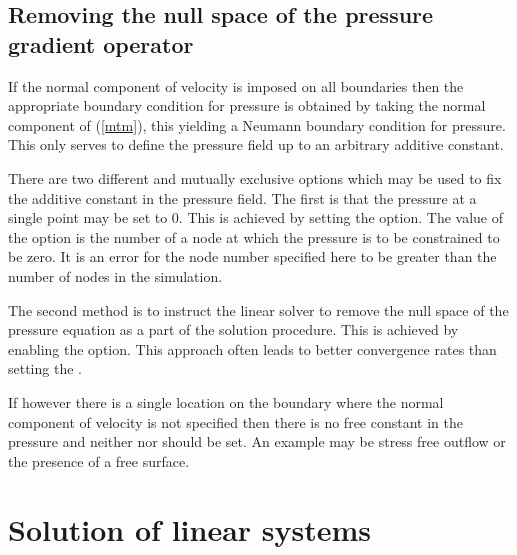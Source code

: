 \subsection{Removing the null space of the pressure gradient operator} \label{Nullspaceremove}

If the normal component of velocity is imposed on all boundaries then the
appropriate boundary condition for pressure 
\citep[see][]{gresho87} is obtained by taking the normal component of
(\ref{mtm}), this yielding a Neumann boundary condition for
pressure. This only serves to define the pressure field up to an
arbitrary additive constant.

There are two different and mutually exclusive options which may be used to
fix the additive constant in the pressure field. The first is that the
pressure at a single point may be set to 0. This is achieved by setting the
 option. The
value of the option is the number of a node at which the pressure is to be
constrained to be zero. It is an error for the node number specified here to
be greater than the number of nodes in the simulation.

The second method is to instruct the linear solver to remove the null space
of the pressure equation as a part of the solution procedure. This is
achieved by enabling the\linebreak
{}
option. This approach often leads to better convergence rates than setting
the .

If however there is a single location on the boundary where the normal
component of velocity is not specified then there is no free constant in the
pressure and neither  nor
 should be set. An example
may be stress free outflow or the presence of a free surface.

\section{Solution of linear systems}\label{Sect:Solve}

